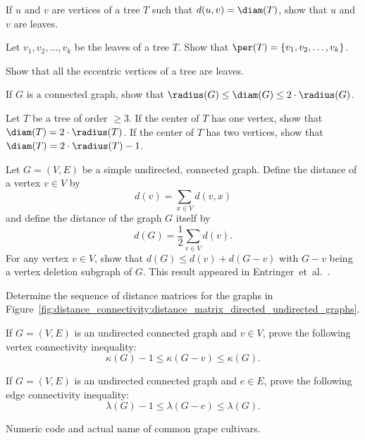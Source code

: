 \begin{problem}
\item If $u$ and $v$ are vertices of a tree $T$ such that
  $d(u,v) = \diam(T)$, show that $u$ and $v$ are leaves.

\item Let $v_1, v_2, \dots, v_k$ be the leaves of a tree $T$. Show
  that $\per(T) = \{v_1, v_2, \dots, v_k\}$.

\item\label{prob:distance_connectivity:eccentric_vertices_laves} Show
  that all the eccentric vertices of a tree are leaves.

\item If $G$ is a connected graph, show that
  $\radius(G) \leq \diam(G) \leq 2 \cdot \radius(G)$.

\item Let $T$ be a tree of order $\geq 3$. If the center of $T$ has
  one vertex, show that $\diam(T) = 2 \cdot \radius(T)$. If the center
  of $T$ has two vertices, show that
  $\diam(T) = 2 \cdot \radius(T) - 1$.

\item Let $G = (V,E)$ be a simple undirected, connected graph. Define
  the distance of a vertex $v \in V$ by
  \[
  d(v)
  =
  \sum_{x \in V} d(v,x)
  \]
  and define the distance of the graph $G$ itself by
  \[
  d(G)
  =
  \frac{1}{2} \sum_{v \in V} d(v).
  \]
  For any vertex $v \in V$, show that
  $d(G) \leq d(v) + d(G - v)$ with $G - v$ being a vertex deletion
  subgraph of $G$. This result appeared in
  Entringer~et~al.~\cite[p.284]{EntringerEtAl1976}.

\item Determine the sequence of distance matrices for the graphs in
  Figure~\ref{fig:distance_connectivity:distance_matrix_directed_undirected_graphs}.

\item If $G = (V,E)$ is an undirected connected graph and $v \in V$,
  prove the following vertex connectivity inequality:
  \[
  \kappa(G) - 1
  \leq
  \kappa(G - v)
  \leq
  \kappa(G).
  \]

\item If $G = (V,E)$ is an undirected connected graph and $e \in E$,
  prove the following edge connectivity inequality:
  \[
  \lambda(G) - 1
  \leq
  \lambda(G - e)
  \leq
  \lambda(G).
  \]

\begin{table}[!htbp]
\centering
{}

\caption{Numeric code and actual name of common grape cultivars.}
\label{tab:distance_connectivity:wine_network}
\end{table}


\end{problem}
